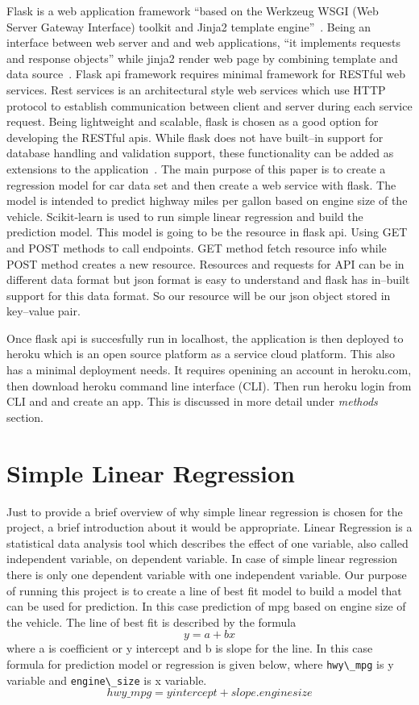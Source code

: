 Flask is a web application framework ``based on the Werkzeug WSGI (Web
Server Gateway Interface) toolkit and Jinja2 template
engine''~\cite{hid-sp18-415-flask}.  Being an interface between web
server and and web applications, ``it implements requests and response
objects'' while jinja2 render web page by combining template and data
source~\cite{hid-sp18-415-www-flask}.  Flask api framework requires
minimal framework for RESTful web services.  Rest services is an
architectural style web services which use HTTP protocol to establish
communication between client and server during each service request.
Being lightweight and scalable, flask is chosen as a good option for
developing the RESTful apis. While flask does not have built--in
support for database handling and validation support, these
functionality can be added as extensions to the
application~\cite{hid-sp18-415-www-flask}.  The main purpose of this
paper is to create a regression model for car data set and then create
a web service with flask. The model is intended to predict highway
miles per gallon based on engine size of the vehicle.  Scikit-learn is
used to run simple linear regression and build the prediction
model. This model is going to be the resource in flask api. Using GET
and POST methods to call endpoints. GET method fetch resource info
while POST method creates a new resource. Resources and requests for
API can be in different data format but json format is easy to
understand and flask has in--built support for this data format. So
our resource will be our json object stored in key--value pair.
  
Once flask api is succesfully run in localhost, the application is
then deployed to heroku which is an open source platform as a service
cloud platform. This also has a minimal deployment needs.  It requires
openining an account in heroku.com, then download heroku command line
interface (CLI). Then run heroku login from CLI and and create an
app. This is discussed in more detail under \textit{methods} section.
  
 
 
\section{Simple Linear Regression}

Just to provide a brief overview of why simple linear regression is
chosen for the project, a brief introduction about it would be
appropriate. Linear Regression is a statistical data analysis tool
which describes the effect of one variable, also called independent
variable, on dependent variable. In case of simple linear regression
there is only one dependent variable with one independent variable.
Our purpose of running this project is to create a line of best fit
model to build a model that can be used for prediction. In this case
prediction of mpg based on engine size of the vehicle. The line of
best fit is described by the formula \[y = a + bx\] where a is
coefficient or y intercept and b is slope for the line. In this case
formula for prediction model or regression is given below, where
\verb|hwy\_mpg| is y variable and \verb|engine\_size| is x variable.
  \[hwy\_mpg = yintercept + slope.enginesize\] 

